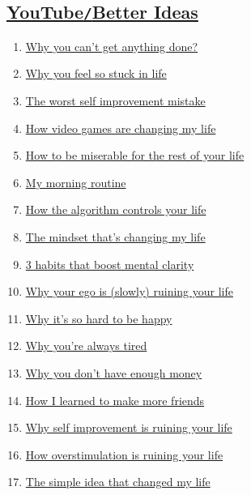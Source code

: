 \documentclass{article}
\begin{document}
\subsection{\href{https://www.youtube.com/channel/UCtUId5WFnN82GdDy7DgaQ7w}{YouTube\texttt{/}Better Ideas}}
\begin{enumerate}
	\item \href{https://www.youtube.com/watch?v=EQf8w8Ed5k0}{Why you can't get anything done?}
	\item \href{https://www.youtube.com/watch?v=I0biBk4Y8Qg}{Why you feel so stuck in life}
	\item \href{https://www.youtube.com/watch?v=wLzteVkyReA}{The worst self improvement mistake}
	\item \href{https://www.youtube.com/watch?v=Rim2rXIbVoA}{How video games are changing my life}
	\item \href{https://www.youtube.com/watch?v=W9qsxhhNUoU}{How to be miserable for the rest of your life}
	\item \href{https://www.youtube.com/watch?v=akRLUpQp5xo}{My morning routine}
	\item \href{https://www.youtube.com/watch?v=8XO53urLcvY}{How the algorithm controls your life}
	\item \href{https://www.youtube.com/watch?v=B-L8CYwglj4}{The mindset that's changing my life}
	\item \href{https://www.youtube.com/watch?v=DbxPgd9DKEY}{3 habits that boost mental clarity}
	\item \href{https://www.youtube.com/watch?v=HHCifdfI47M}{Why your ego is (slowly) ruining your life}
	\item \href{https://www.youtube.com/watch?v=rQoS_S9K464}{Why it's so hard to be happy}
	\item \href{https://www.youtube.com/watch?v=js2vfr96iAQ}{Why you're always tired}
	\item \href{https://www.youtube.com/watch?v=SHFAZv8PR_c}{Why you don't have enough money}
	\item \href{https://www.youtube.com/watch?v=nm7OMGjbCgc}{How I learned to make more friends}
	\item \href{https://www.youtube.com/watch?v=DEz7oJy37lI}{Why self improvement is ruining your life}
	\item \href{https://www.youtube.com/watch?v=yYWvUoN4yt8}{How overstimulation is ruining your life}
	\item \href{https://www.youtube.com/watch?v=6U06IfrhN6k}{The simple idea that changed my life}

\end{enumerate}
\end{document}
